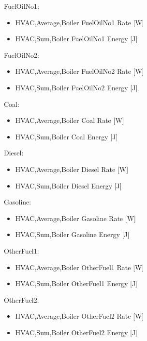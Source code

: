 FuelOilNo1:

\begin{itemize}
    \item
    HVAC,Average,Boiler FuelOilNo1 Rate {[}W{]}
    \item
    HVAC,Sum,Boiler FuelOilNo1 Energy {[}J{]}
\end{itemize}

FuelOilNo2:

\begin{itemize}
    \item
    HVAC,Average,Boiler FuelOilNo2 Rate {[}W{]}
    \item
    HVAC,Sum,Boiler FuelOilNo2 Energy {[}J{]}
\end{itemize}

Coal:

\begin{itemize}
    \item
    HVAC,Average,Boiler Coal Rate {[}W{]}
    \item
    HVAC,Sum,Boiler Coal Energy {[}J{]}
\end{itemize}

Diesel:

\begin{itemize}
    \item
    HVAC,Average,Boiler Diesel Rate {[}W{]}
    \item
    HVAC,Sum,Boiler Diesel Energy {[}J{]}
\end{itemize}

Gasoline:

\begin{itemize}
    \item
    HVAC,Average,Boiler Gasoline Rate {[}W{]}
    \item
    HVAC,Sum,Boiler Gasoline Energy {[}J{]}
\end{itemize}

OtherFuel1:

\begin{itemize}
    \item
    HVAC,Average,Boiler OtherFuel1 Rate {[}W{]}
    \item
    HVAC,Sum,Boiler OtherFuel1 Energy {[}J{]}
\end{itemize}

OtherFuel2:

\begin{itemize}
    \item
    HVAC,Average,Boiler OtherFuel2 Rate {[}W{]}
    \item
    HVAC,Sum,Boiler OtherFuel2 Energy {[}J{]}
\end{itemize}

